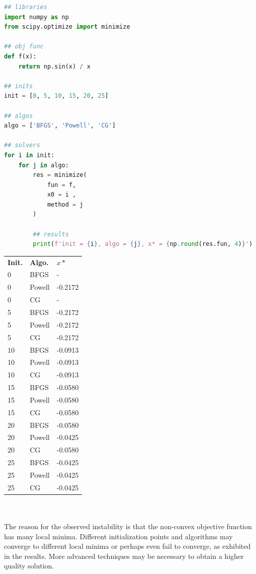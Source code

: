 \documentclass{article}
\begin{document}
\begin{enumerate}
\begin{enumerate}
\begin{lstlisting}[language=Python, title=Fig. Python 1.2(a)]
## libraries
import numpy as np
from scipy.optimize import minimize

## obj func
def f(x):
    return np.sin(x) / x

## inits
init = [0, 5, 10, 15, 20, 25]

## algos
algo = ['BFGS', 'Powell', 'CG']

## solvers
for i in init:
    for j in algo:
        res = minimize(
            fun = f, 
            x0 = i , 
            method = j
        )
        
        ## results
        print(f'init = {i}, algo = {j}, x* = {np.round(res.fun, 4)}')
\end{lstlisting}

\begin{center}
    \begin{tabular}{lll}
        \textbf{Init. } & \textbf{Algo. } & \textbf{$x*$} \\
        0 & BFGS & - \\
        0 & Powell & -0.2172 \\
        0 & CG & -\\
        5 & BFGS & -0.2172 \\
        5 & Powell & -0.2172 \\
        5 & CG & -0.2172 \\
        10 & BFGS & -0.0913 \\
        10 & Powell & -0.0913 \\
        10 & CG & -0.0913 \\
        15 & BFGS & -0.0580 \\
        15 & Powell & -0.0580 \\
        15 & CG & -0.0580 \\
        20 & BFGS & -0.0580 \\
        20 & Powell & -0.0425 \\
        20 & CG & -0.0580 \\
        25 & BFGS & -0.0425 \\
        25 & Powell & -0.0425 \\
        25 & CG & -0.0425 \\
    \end{tabular}    
\end{center}\\~\\

The reason for the observed instability is that the non-convex objective function has many local minima. Different initialization points and algorithms may converge to different local minima or perhaps even fail to converge, as exhibited in the results. More advanced techniques may be necessary to obtain a higher quality solution.


\end{enumerate}
\end{enumerate}
\end{document}

